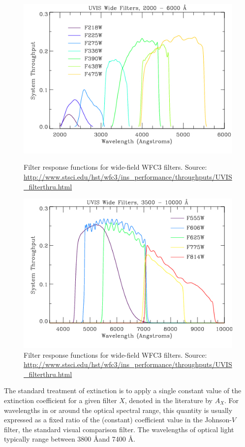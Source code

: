 \documentclass[12pt, a4paper]{report}
\begin{document}
\begin{figure}[h]
\begin{center}
\includegraphics[scale=0.5]{UVIS_Wide1.jpg}
\caption{Filter response functions for wide-field WFC3 filters. Source: \protect\url{http://www.stsci.edu/hst/wfc3/ins_performance/throughputs/UVIS_filterthru.html}}
\label{WFC3_response_funcs1}

\includegraphics[scale=0.5]{UVIS_Wide2.jpg}
\caption{Filter response functions for wide-field WFC3 filters. Source: \protect\url{http://www.stsci.edu/hst/wfc3/ins_performance/throughputs/UVIS_filterthru.html}}
\label{WFC3_response_funcs2}
\end{center}
\end{figure}

The standard treatment of extinction is to apply a single constant value of the extinction coefficient for a given filter $X$, denoted in the literature by $A_{X}$. For wavelengths in or around the optical spectral range, this quantity is usually expressed as a fixed ratio of the (constant) coefficient value in the Johnson-$V$ filter, the standard visual comparison filter. The wavelengths of optical light typically range between 3800 \AA and 7400 \AA.
\end{document}
